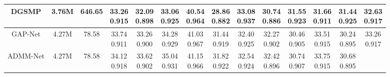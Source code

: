 \documentclass{article}
\begin{document}
\begin{table*}[t]
{\begin{tabular}{cccccccccccccc}
			\\
			\midrule
			DGSMP \cite{gsm}
			& 3.76M
			& 646.65
			&\tabincell{c}{33.26\\0.915}
			&\tabincell{c}{32.09\\0.898}
			&\tabincell{c}{33.06\\0.925}
			&\tabincell{c}{40.54\\0.964}
			&\tabincell{c}{28.86\\0.882}
			&\tabincell{c}{33.08\\0.937}
			&\tabincell{c}{30.74\\0.886}
			&\tabincell{c}{31.55\\0.923}
			&\tabincell{c}{31.66\\0.911}
			&\tabincell{c}{31.44\\0.925}
			&\tabincell{c}{32.63\\0.917}
			\\
			\midrule
			GAP-Net \cite{gapnet}
			& 4.27M
			& 78.58
			&\tabincell{c}{33.74\\0.911}
			&\tabincell{c}{33.26\\0.900}
			&\tabincell{c}{34.28\\0.929}
			&\tabincell{c}{41.03\\0.967}
			&\tabincell{c}{31.44\\0.919}
			&\tabincell{c}{32.40\\0.925}
			&\tabincell{c}{32.27\\0.902}
			&\tabincell{c}{30.46\\0.905}
			&\tabincell{c}{33.51\\0.915}
			&\tabincell{c}{30.24\\0.895}
			&\tabincell{c}{33.26\\0.917}
			\\
			\midrule
			ADMM-Net \cite{admm-net}
			& 4.27M
			& 78.58
			&\tabincell{c}{34.12\\0.918}
			&\tabincell{c}{33.62\\0.902}
			&\tabincell{c}{35.04\\0.931}
			&\tabincell{c}{41.15\\0.966}
			&\tabincell{c}{31.82\\0.922}
			&\tabincell{c}{32.54\\0.924}
			&\tabincell{c}{32.42\\0.896}
			&\tabincell{c}{30.74\\0.907}
			&\tabincell{c}{33.75\\0.915}
			&\tabincell{c}{30.68\\0.895}

\end{tabular}}
\end{table*}
\end{document}
